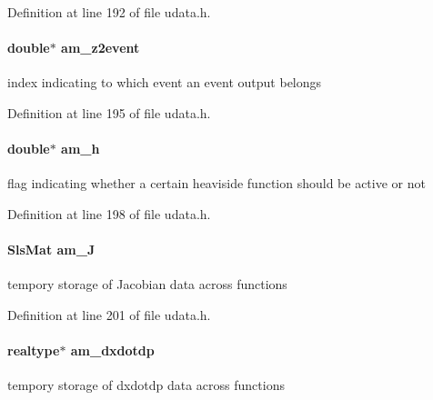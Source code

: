 Definition at line 192 of file udata.\+h.

\hypertarget{struct_user_data_af16fc75b57c68ab1d3784cc71ab073a9}{}
\paragraph[{am\+\_\+z2event}]{\setlength{\rightskip}{0pt plus 5cm}double$\ast$ am\+\_\+z2event}\label{struct_user_data_af16fc75b57c68ab1d3784cc71ab073a9}
index indicating to which event an event output belongs 

Definition at line 195 of file udata.\+h.

\hypertarget{struct_user_data_a1a976a80dc74446059468485a0f279e1}{}
\paragraph[{am\+\_\+h}]{\setlength{\rightskip}{0pt plus 5cm}double$\ast$ am\+\_\+h}\label{struct_user_data_a1a976a80dc74446059468485a0f279e1}
flag indicating whether a certain heaviside function should be active or not 

Definition at line 198 of file udata.\+h.

\hypertarget{struct_user_data_a822be7d2872832008aa0b7c0282b04f6}{}
\paragraph[{am\+\_\+\+J}]{\setlength{\rightskip}{0pt plus 5cm}Sls\+Mat am\+\_\+\+J}\label{struct_user_data_a822be7d2872832008aa0b7c0282b04f6}
tempory storage of Jacobian data across functions 

Definition at line 201 of file udata.\+h.

\hypertarget{struct_user_data_a04716137a064f7c6d85c04aeb235b4f0}{}
\paragraph[{am\+\_\+dxdotdp}]{\setlength{\rightskip}{0pt plus 5cm}realtype$\ast$ am\+\_\+dxdotdp}\label{struct_user_data_a04716137a064f7c6d85c04aeb235b4f0}
tempory storage of dxdotdp data across functions 

